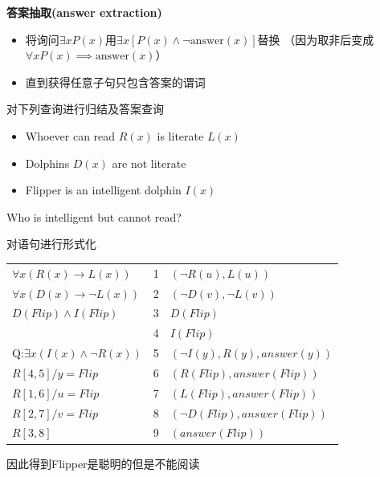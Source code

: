 \myhline
\textbf{答案抽取(answer extraction)}
\begin{itemize}
\item 将询问$\exists xP(x)$用$\exists x[P(x)\land\lnot\text{answer}(x)]$替换
（因为取非后变成$\forall x P(x)\implies \text{answer}(x)$）
\item 直到获得任意子句只包含答案的谓词
\end{itemize}
\begin{example}
对下列查询进行归结及答案查询
\begin{itemize}
	\item Whoever can read $R(x)$ is literate $L(x)$
	\item Dolphins $D(x)$ are not literate
	\item Flipper is an intelligent dolphin $I(x)$
\end{itemize}
Who is intelligent but cannot read?
\end{example}
\begin{analysis}
对语句进行形式化
\begin{center}
\begin{tabular}{lll}
$\forall x (R(x)\to L(x))$ & 1 & $(\lnot R(u),L(u))$\\
$\forall x (D(x)\to \lnot L(x))$ & 2 & $(\lnot D(v),\lnot L(v))$\\
$D(Flip)\land I(Flip)$ & 3 & $D(Flip)$\\
 & 4 & $I(Flip)$\\
Q:$\exists x (I(x)\land\lnot R(x))$ & 5 & $(\lnot I(y),R(y),answer(y))$\\\hline 
$R[4,5]/y=Flip$ & 6 & $(R(Flip),answer(Flip))$\\
$R[1,6]/u=Flip$ & 7 & $(L(Flip),answer(Flip))$\\
$R[2,7]/v=Flip$ & 8 & $(\lnot D(Flip),answer(Flip))$\\
$R[3,8]$ & 9 & $(answer(Flip))$
\end{tabular}
\end{center}
因此得到Flipper是聪明的但是不能阅读
\end{analysis}